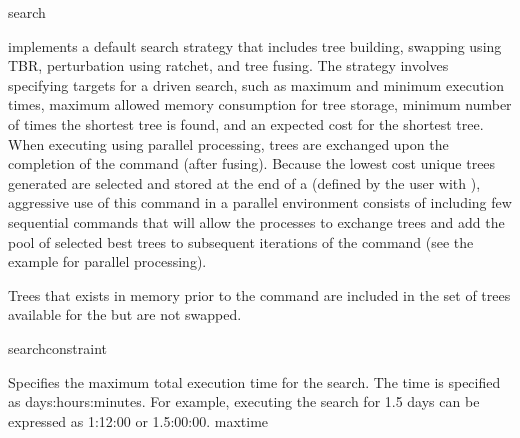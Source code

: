 \begin{command}{search}{}


\begin{poydescription}
 implements a default search strategy that
includes tree building, swapping using TBR, perturbation using
ratchet, and tree fusing. The strategy involves specifying targets for 
a driven search, such as maximum and minimum execution times, 
maximum allowed memory consumption for tree storage, minimum number of times the
shortest tree is found, and an expected cost for the shortest tree. When executing
 using parallel processing, trees are exchanged upon the
completion of the command (after fusing). Because the lowest cost unique trees 
generated are selected and stored at the end of a  
(defined by the user with ), aggressive use of this 
command in a parallel environment consists of including few sequential
 commands that will allow the processes to
exchange trees and add the pool of selected best trees to subsequent 
iterations of the command (see the example for parallel processing).

Trees that exists in memory prior to the  command
are included in the set of trees available for the
 but are not swapped.
\end{poydescription}

\begin{arguments}

{searchconstraint}



{Specifies the maximum total execution time for the search. The time is specified as
days:hours:minutes. For example, executing the search for 1.5 days can
be expressed as 1:12:00 or 1.5:00:00.}
{maxtime}


\end{arguments}
\end{command}

